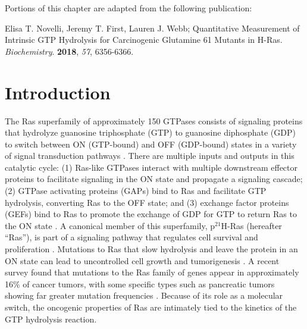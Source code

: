 Portions of this chapter are adapted from the following publication: 

\noindent Elisa T. Novelli, Jeremy T. First, Lauren J. Webb; Quantitative Measurement of Intrinsic GTP Hydrolysis for Carcinogenic Glutamine 61 Mutants in H-Ras. \emph{Biochemistry}. \textbf{2018}, \emph{57}, 6356-6366.

\section{Introduction} \label{ras-intro}

The Ras superfamily of approximately 150 GTPases consists of signaling proteins that hydrolyze guanosine triphosphate (GTP) to guanosine diphosphate (GDP) to switch between ON (GTP-bound) and OFF (GDP-bound) states in a variety of signal transduction pathways \cite{Bourne1991, Krauss2003}.
There are multiple inputs and outputs in this catalytic cycle: (1) Ras-like GTPases interact with multiple downstream effector proteins to facilitate signaling in the ON state and propagate a signaling cascade; (2) GTPase activating proteins (GAPs) bind to Ras and facilitate GTP hydrolysis, converting Ras to the OFF state; and (3) exchange factor proteins (GEFs) bind to Ras to promote the exchange of GDP for GTP to return Ras to the ON state \cite{Krauss2003, Cherfils2013, Khrenova2015}.
A canonical member of this superfamily, p$^{21}$H-Ras (hereafter ``Ras''), is part of a signaling pathway that regulates cell survival and proliferation \cite{Shields2000, Cox2003, Downward2003, Repasky2004, Prior2012}.
Mutations to Ras that slow hydrolysis and leave the protein in an ON state can lead to uncontrolled cell growth and tumorigenesis \cite{Prior2012}. 
A recent survey found that mutations to the Ras family of genes appear in approximately 16\% of cancer tumors, with some specific types such as pancreatic tumors showing far greater mutation frequencies \cite{Prior2012}. 
Because of its role as a molecular switch, the oncogenic properties of Ras are intimately tied to the kinetics of the GTP hydrolysis reaction.

